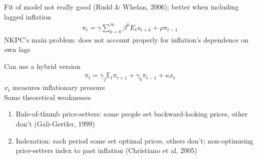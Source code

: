 \documentclass{beamer}
\begin{document}
\begin{frame}
 Fit of model not really good (Rudd \& Whelan, 2006); better when including lagged inflation
\begin{align}
  \pi_t = \gamma \sum_{k=0}^{\infty} \beta^k E_t s_{t+k} + \rho \pi_{t-1}
\end{align}
NKPC's main problem: does not account properly for inflation's dependence on own lags
\end{frame}

\begin{frame}
  Can use a hybrid version
  \begin{align}
    \pi_t = \gamma_f \mathbb{E}_t\pi_{t+1} +\gamma_b \pi_{t-1} + \kappa x_t
  \end{align}
  $x_t$ measures inflationary pressure\\
  Some theoretical weaknesses
  \begin{enumerate}
    \item Rule-of-thumb price-setters: some people set backward-looking prices, other don't (Gali-Gertler, 1999)
    \item Indexation: each period some set optimal prices, others don't; non-optimising price-setters index to past inflation (Christiano et al, 2005)
  \end{enumerate}
\end{frame}


\end{document}

